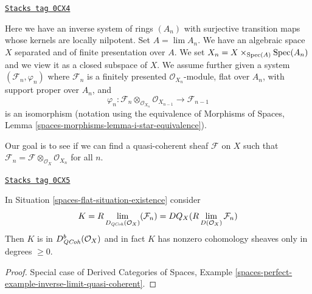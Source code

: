 \begin{definition}
\label{spaces-flat-situation-existence}
\href{https://stacks.math.columbia.edu/tag/0CX4}{\texttt{Stacks tag 0CX4}}

Here we have an inverse system of rings $(A_n)$ with surjective transition
maps whose kernels are locally nilpotent. Set $A = \lim A_n$. We have an
algebraic space $X$ separated and of finite presentation over $A$.
We set $X_n = X \times_{\operatorname{Spec}(A)} \operatorname{Spec}(A_n)$ and we
view it as a closed subspace of $X$. We assume further given a system
$(\mathcal{F}_n, \varphi_n)$ where $\mathcal{F}_n$ is a finitely presented
$\mathcal{O}_{X_n}$-module, flat over $A_n$, with support proper over $A_n$,
and
$$
\varphi_n :
\mathcal{F}_n \otimes_{\mathcal{O}_{X_n}} \mathcal{O}_{X_{n - 1}}
\longrightarrow
\mathcal{F}_{n - 1}
$$
is an isomorphism (notation using the equivalence of
Morphisms of Spaces, Lemma \ref{spaces-morphisms-lemma-i-star-equivalence}).
\end{definition}

Our goal is to see if we can find a quasi-coherent sheaf $\mathcal{F}$
on $X$ such that
$\mathcal{F}_n = \mathcal{F} \otimes_{\mathcal{O}_X} \mathcal{O}_{X_n}$
for all $n$.

\begin{lemma}
\label{spaces-flat-lemma-compute-what-it-should-be}
\href{https://stacks.math.columbia.edu/tag/0CX5}{\texttt{Stacks tag 0CX5}}

In Situation \ref{spaces-flat-situation-existence} consider
$$
K = R\lim_{D_{\mathit{QCoh}}(\mathcal{O}_X)}(\mathcal{F}_n) =
DQ_X(R\lim_{D(\mathcal{O}_X)}\mathcal{F}_n)
$$
Then $K$ is in $D^b_{\mathit{QCoh}}(\mathcal{O}_X)$ and in fact
$K$ has nonzero cohomology sheaves only in degrees $\geq 0$.
\end{lemma}

\begin{proof}
Special case of
Derived Categories of Spaces, Example
\ref{spaces-perfect-example-inverse-limit-quasi-coherent}.
\end{proof}

